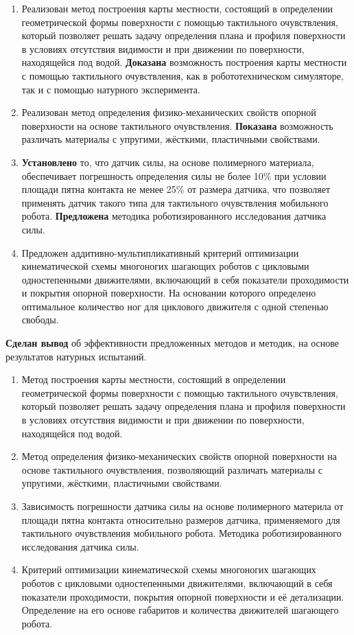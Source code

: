 {\novelty} 
\begin{enumerate}
    \item Реализован метод построения карты местности, состоящий в определении геометрической формы поверхности с помощью тактильного очувствления, который позволяет решать задачу определения плана и профиля поверхности в условиях отсутствия видимости и при движении по поверхности, находящейся под водой. \textbf{Доказана} возможность построения карты местности с помощью тактильного очувствления, как в робототехническом симуляторе, так и с помощью натурного эксперимента.
    \item Реализован метод определения физико-механических свойств опорной поверхности на основе тактильного очувствления. \textbf{Показана} возможность различать материалы с упругими, жёсткими, пластичными свойствами.
    \item \textbf{Установлено} то, что датчик силы, на основе полимерного материала, обеспечивает погрешность определения силы не более 10\% при условии площади пятна контакта не менее 25\% от размера датчика, что позволяет применять датчик такого типа для тактильного очувствления мобильного робота. \textbf{Предложена} методика роботизированного исследования датчика силы.
    \item Предложен аддитивно-мультипликативный критерий оптимизации кинематической схемы многоногих шагающих роботов с цикловыми одностепенными движителями, включающий в себя показатели проходимости и покрытия опорной поверхности. На основании которого определено оптимальное количество ног для циклового движителя с одной степенью свободы.
\end{enumerate}

\textbf{Сделан вывод} об эффективности предложенных методов и методик, на основе результатов натурных испытаний.

{}
\begin{enumerate}[beginpenalty=10000] %
    \item Метод построения карты местности, состоящий в определении геометрической формы поверхности с помощью тактильного очувствления, который позволяет решать задачу определения плана и профиля поверхности в условиях отсутствия видимости и при движении по поверхности, находящейся под водой.
    \item Метод определения физико-механических свойств опорной поверхности на основе тактильного очувствления, позволяющий различать материалы с упругими, жёсткими, пластичными свойствами.
    \item Зависимость погрешности датчика силы на основе полимерного материла от площади пятна контакта относительно размеров датчика, применяемого для тактильного очувствления мобильного робота. Методика роботизированного исследования датчика силы.
    \item Критерий оптимизации кинематической схемы многоногих шагающих роботов с цикловыми одностепенными движителями, включающий в себя показатели проходимости, покрытия опорной поверхности и её детализации. Определение на его основе габаритов и количества движителей шагающего робота.
\end{enumerate}

